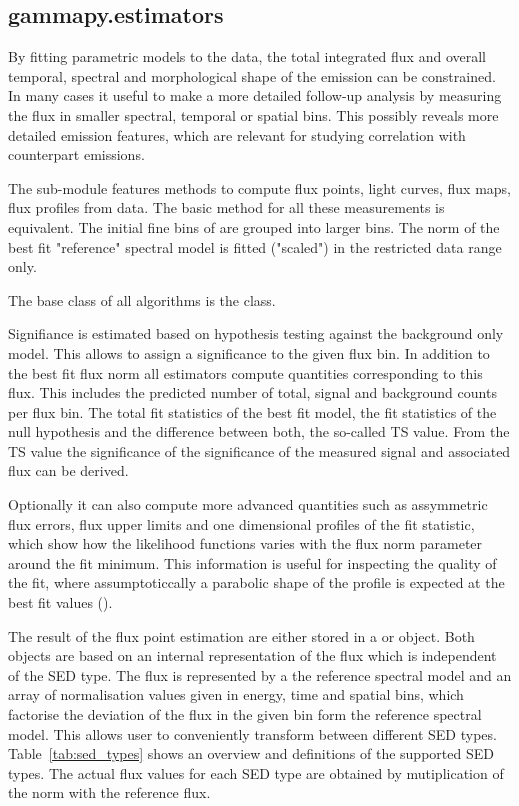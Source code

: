 \subsection{gammapy.estimators}
\label{ssec:gammapy-estimators}
By fitting parametric models to the data, the total integrated
flux and overall temporal, spectral and morphological shape of the
\gammaray emission can be constrained. In many cases it useful
to make a more detailed follow-up analysis by measuring the
flux in smaller spectral, temporal or spatial bins. This
possibly reveals more detailed emission features, which
are relevant for studying correlation with counterpart emissions.

The  sub-module features methods to compute flux
points, light curves, flux maps, flux profiles from data.
The basic method for all these measurements is equivalent.
The initial fine bins of  are grouped into
larger bins. The norm of the best fit "reference" spectral
model is fitted ("scaled") in the  restricted data range only.

The base class of all algorithms is the   class.

Signifiance is estimated based on hypothesis
testing against the background only model. This allows
to assign a significance to the given flux bin.
In addition to the best fit flux norm all estimators compute
quantities corresponding to this flux. This includes
the predicted number of total, signal and background
counts per flux bin. The total fit statistics
of the best fit model, the fit statistics of the
null hypothesis and the difference between both,
the so-called TS value.
From the TS value the significance of the
significance of the measured signal and associated flux
can be derived.

Optionally it can also compute more advanced quantities
such as assymmetric flux errors, flux upper limits
and one dimensional profiles of the fit statistic,
which show how the likelihood functions varies with
the flux norm parameter around the fit minimum.
This information is useful for inspecting the quality
of the fit, where assumptoticcally a parabolic
shape of the profile is expected at the best fit
values ().

The result of the flux point estimation are either stored in a
 or  object. Both objects
are based on an internal representation of the flux which is
independent of the SED type. The flux is represented by a
the reference spectral model and an array of
normalisation values given in energy, time and spatial bins,
which factorise the deviation of the flux in the given
bin form the reference spectral model. This allows
user to conveniently transform between different
SED types. Table~\ref{tab:sed_types} shows an
overview and definitions of the supported SED types.
The actual flux values for each SED type are obtained
by mutiplication of the norm with the  reference flux.

